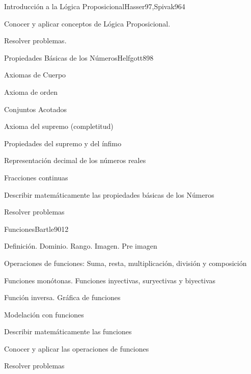 \begin{sumilla}
\begin{unit}{Introducci\'on a la L\'ogica Proposicional}{Hasser97,Spivak96}{4}
   \begin{objetivos}
      \item Conocer y aplicar conceptos de L\'ogica Proposicional.
	\item Resolver problemas.
   \end{objetivos}
\end{unit}

\begin{unit}{Propiedades B\'asicas de los N\'umeros}{Helfgott89}{8}
\begin{topicos}
	\item Axiomas de Cuerpo
	\item Axioma de orden
	\item Conjuntos Acotados
	\item Axioma del supremo  (completitud)
	\item Propiedades del supremo y del \'infimo
	\item Representaci\'on decimal de los n\'umeros reales
	\item Fracciones continuas
\end{topicos}
\begin{objetivos}
	\item Describir matem\'aticamente las propiedades b\'asicas de los N\'umeros
	\item Resolver problemas
\end{objetivos}
\end{unit}

\begin{unit}{Funciones}{Bartle90}{12}
\begin{topicos}
      \item Definici\'on. Dominio. Rango. Imagen. Pre imagen
      \item Operaciones de funciones: Suma, resta, multiplicaci\'on, divisi\'on y composici\'on
      \item Funciones mon\'otonas. Funciones inyectivas,  suryectivas y biyectivas
      \item Funci\'on inversa. Gr\'afica de funciones
      \item Modelaci\'on con funciones
\end{topicos}

   \begin{objetivos}
      \item Describir matem\'aticamente las funciones
      \item Conocer y aplicar las operaciones de funciones
	\item Resolver problemas
   \end{objetivos}
\end{unit}


\end{sumilla}

